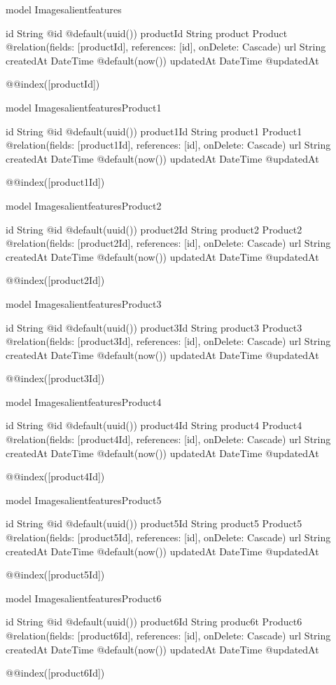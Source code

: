model Imagesalientfeatures {
  id        String   @id @default(uuid())
  productId String
  product   Product  @relation(fields: [productId], references: [id], onDelete: Cascade)
  url       String
  createdAt DateTime @default(now())
  updatedAt DateTime @updatedAt

  @@index([productId])
}

model ImagesalientfeaturesProduct1 {
  id         String   @id @default(uuid())
  product1Id String
  product1   Product1 @relation(fields: [product1Id], references: [id], onDelete: Cascade)
  url        String
  createdAt  DateTime @default(now())
  updatedAt  DateTime @updatedAt

  @@index([product1Id])
}

model ImagesalientfeaturesProduct2 {
  id         String   @id @default(uuid())
  product2Id String
  product2   Product2 @relation(fields: [product2Id], references: [id], onDelete: Cascade)
  url        String
  createdAt  DateTime @default(now())
  updatedAt  DateTime @updatedAt

  @@index([product2Id])
}

model ImagesalientfeaturesProduct3 {
  id         String   @id @default(uuid())
  product3Id String
  product3   Product3 @relation(fields: [product3Id], references: [id], onDelete: Cascade)
  url        String
  createdAt  DateTime @default(now())
  updatedAt  DateTime @updatedAt

  @@index([product3Id])
}

model ImagesalientfeaturesProduct4 {
  id         String   @id @default(uuid())
  product4Id String
  product4   Product4 @relation(fields: [product4Id], references: [id], onDelete: Cascade)
  url        String
  createdAt  DateTime @default(now())
  updatedAt  DateTime @updatedAt

  @@index([product4Id])
}

model ImagesalientfeaturesProduct5 {
  id         String   @id @default(uuid())
  product5Id String
  product5   Product5 @relation(fields: [product5Id], references: [id], onDelete: Cascade)
  url        String
  createdAt  DateTime @default(now())
  updatedAt  DateTime @updatedAt

  @@index([product5Id])
}

model ImagesalientfeaturesProduct6 {
  id         String   @id @default(uuid())
  product6Id String
  produc6t   Product6 @relation(fields: [product6Id], references: [id], onDelete: Cascade)
  url        String
  createdAt  DateTime @default(now())
  updatedAt  DateTime @updatedAt

  @@index([product6Id])
}


